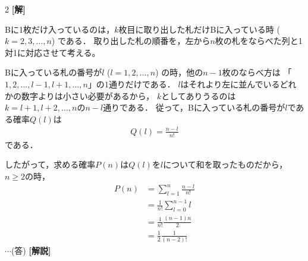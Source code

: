 \documentclass[../../../../main.tex]{subfiles}
\begin{document}
\setcounter{equation}{0}
\begin{oframed}
    
\end{oframed}
\setlength{\columnseprule}{0.4pt}
\begin{multicols}{2}
    {\bf[解]}

    Bに1枚だけ入っているのは，$k$枚目に取り出した札だけBに入っている時 ($k=2,3,\dots,n$) である．
    取り出した札の順番を，左から$n$枚の札をならべた列と1対1に対応させて考える。

    Bに入っている札の番号が$l$ ($l=1,2,\dots,n$) の時，他の$n-1$枚のならべ方は
    「$1,2,\dots,l-1,l+1,\dots,n$」の$1$通りだけである．
    $l$はそれより左に並んでいるどれかの数字よりは小さい必要があるから，
    $k$としてありうるのは$k=l+1,l+2,\dots,n$の$n-l$通りである．
    従って，Bに入っている札の番号が$l$である確率$Q(l)$は
    \begin{align*}
        Q(l) = \frac{n-l}{n!}
    \end{align*}
    である．

    したがって，求める確率$P(n)$は$Q(l)$を$l$について和を取ったものだから，$n \ge 2$の時，
    \begin{align*}
        P(n)
         & = \sum_{l=1}^{n} \frac{n-l}{n!}   \\
         & = \frac{1}{n!} \sum_{l=0}^{n-1} l \\
         & = \frac{1}{n!} \frac{(n-1)n}{2}   \\
         & = \frac{1}{2}\frac{1}{(n-2)!}
    \end{align*}
    $\cdots$(答)
    {\bf[解説]}

    \newpage
\end{multicols}
\end{document}
